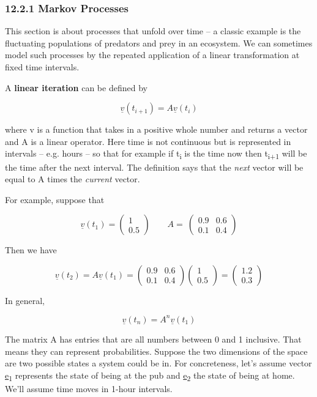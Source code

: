 \documentclass[oneside,english]{amsbook}
\numberwithin{section}{chapter}
\theoremstyle{plain}
\theoremstyle{definition}
\begin{document}
\subsubsection{12.2.1 Markov Processes}\label{markov-processes}

This section is about processes that unfold over time -- a classic
example is the fluctuating populations of predators and prey in an
ecosystem. We can sometimes model such processes by the repeated
application of a linear transformation at fixed time intervals.

A \textbf{linear iteration} can be defined by

\[\underline{v}\left( t_{i + 1} \right) = A\underline{v}(t_{i})\]

where v is a function that takes in a positive whole number and returns
a vector and A is a linear operator. Here time is not continuous but is
represented in intervals -- e.g. hours -- so that for example if
t\textsubscript{i} is the time now then t\textsubscript{i+1} will be the
time after the next interval. The definition says that the \emph{next}
vector will be equal to A times the \emph{current} vector.

For example, suppose that

\[\underline{v}\left( t_{1} \right) = \begin{pmatrix}
	1 \\
	0.5
\end{pmatrix}\ \ \ \ \ \ \ \ \ A = \ \begin{pmatrix}
	0.9 & 0.6 \\
	0.1 & 0.4
\end{pmatrix}\]

Then we have

\[{\underline{v}\left( t_{2} \right) = A\underline{v}\left( t_{1} \right)
}{= \begin{pmatrix}
		0.9 & 0.6 \\
		0.1 & 0.4
	\end{pmatrix}\begin{pmatrix}
		1 \\
		0.5
	\end{pmatrix}
}{= \begin{pmatrix}
		1.2 \\
		0.3
\end{pmatrix}}\]

In general,

\[\underline{v}\left( t_{n} \right) = A^{n}\underline{v}\left( t_{1} \right)\]

The matrix A has entries that are all numbers between 0 and 1 inclusive.
That means they can represent probabilities. Suppose the two dimensions
of the space are two possible states a system could be in. For
concreteness, let's assume vector \ul{e}\textsubscript{1} represents the
state of being at the pub and \ul{e}\textsubscript{2} the state of being
at home. We'll assume time moves in 1-hour intervals.
\end{document}
